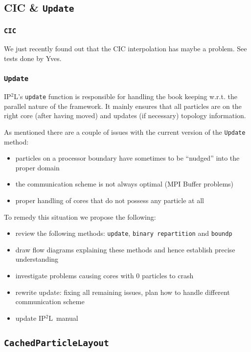 \documentclass[10pt,a4paper]{scrartcl}
\newcommand{\ippl}{\textsc{IP$^2$L}}
\begin{document}
\subsection{CIC \& \texttt{Update}}

\subsubsection{\texttt{CIC}}
We just recently found out that the CIC interpolation has maybe a problem. See tests done by Yves.
\subsubsection{\texttt{Update}}

\ippl's \texttt{update} function is responsible for handling the book keeping w.r.t. the parallel nature of the framework.  It mainly ensures that all particles are
on the right core (after having moved) and updates (if necessary)
topology information.

As mentioned there are a couple of issues with the current version of the
\texttt{Update} method:
%
\begin{itemize}
    \item particles on a processor boundary have sometimes to be ``nudged'' into the proper domain
    \item the communication scheme is not always optimal (MPI Buffer problems)
    \item proper handling of cores that do not possess any particle at all
\end{itemize}
%
To remedy this situation we propose the following:
%
\begin{itemize}
    \item review the following methods: \texttt{update}, \texttt{binary repartition} and \texttt{boundp}
    \item draw flow diagrams explaining these methods and hence
    establish precise understanding
    \item investigate problems causing cores with 0 particles to crash
    \item rewrite update: fixing all remaining issues, plan how to
    handle different communication scheme
    \item update \ippl~manual
\end{itemize}


\subsection{\texttt{CachedParticleLayout}}
\end{document}
